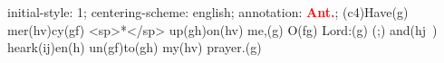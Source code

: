 initial-style: 1;
centering-scheme: english;
annotation: \textbf{\textcolor{red}{Ant.}};
(c4)Have(g) mer(hv)cy(gf) <sp>*</sp> up(gh)on(hv) me,(g) O(fg) Lord:(g) (;) and(hj~) heark(ij)en(h) un(gf)to(gh) my(hv) prayer.(g)